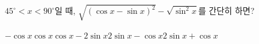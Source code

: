 $45^\circ<x<90^\circ$일 때, $\sqrt{(\cos x-\sin x)^2}-\sqrt{\sin^2 x}$를 간단히 하면?
\begin{choicesii}{$-\cos x$}{$\cos x$}{$\cos x-2\sin x$}{$2\sin x-\cos x$}{$2\sin x+\cos x$}\end{choicesii}
